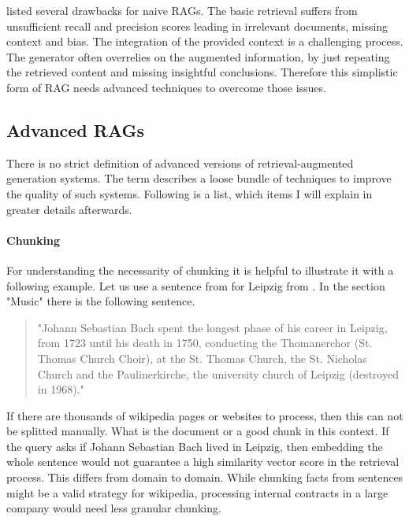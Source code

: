 \citet{Gao.18.12.2023} listed several drawbacks for naive RAGs. The basic retrieval suffers from unsufficient recall and precision scores leading in irrelevant documents, missing context and bias. The integration of the provided context is a challenging process. The generator often overrelies on the augmented information, by just repeating the retrieved content and missing insightful conclusions. Therefore this simplistic form of RAG needs advanced techniques to overcome those issues. 

\subsection{Advanced RAGs}
\label{sec:advanced_rags}

There is no strict definition of advanced versions of retrieval-augmented generation systems. The term describes a loose bundle of techniques to improve the quality of such systems. Following is a list, which items I will explain in greater details afterwards.

\paragraph{Chunking}
\label{sec:chunk}
For understanding the necessarity of chunking it is helpful to illustrate it with a following example. Let us use a sentence from \citeauthor{LeipzigWikipedia.2025} for Leipzig from \citeyear{LeipzigWikipedia.2025}. In the section "Music" there is the following sentence. 

\begin{quote}
    "Johann Sebastian Bach spent the longest phase of his career in Leipzig, from 1723 until his death in 1750, conducting the Thomanerchor (St. Thomas Church Choir), at the St. Thomas Church, the St. Nicholas Church and the Paulinerkirche, the university church of Leipzig (destroyed in 1968)."
\end{quote}

If there are thousands of wikipedia pages or websites to process, then this can not be splitted manually. What is the document or a good chunk in this context. If the query asks if Johann Sebastian Bach lived in Leipzig, then embedding the whole sentence would not guarantee a high similarity vector score in the retrieval process. This differs from domain to domain. While chunking facts from sentences might be a valid strategy for wikipedia, processing internal contracts in a large company would need less granular chunking. 

